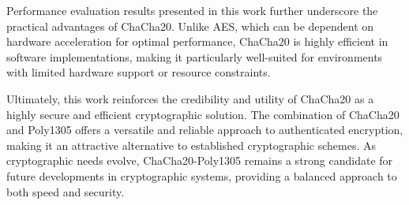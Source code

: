 \documentclass[a4paper,12pt]{report}
\begin{document}
Performance evaluation results presented in this work further underscore the practical advantages of ChaCha20.
Unlike AES, which can be dependent on hardware acceleration for optimal performance, ChaCha20 is highly efficient in software implementations, making it particularly well-suited for environments with limited hardware support or resource constraints.

Ultimately, this work reinforces the credibility and utility of ChaCha20 as a highly secure and efficient cryptographic solution.
The combination of ChaCha20 and Poly1305 offers a versatile and reliable approach to authenticated encryption, making it an attractive alternative to established cryptographic schemes.
As cryptographic needs evolve, ChaCha20-Poly1305 remains a strong candidate for future developments in cryptographic systems, providing a balanced approach to both speed and security\cite{duck_ai}.

\fontsize{12}{8}\selectfont


\end{document}
